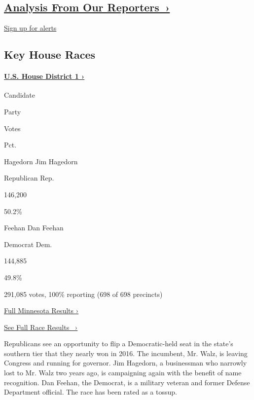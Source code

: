 \hypertarget{analysis-from-our-reporters-}{%
\subsection{\texorpdfstring{\href{https://www.nytimes3xbfgragh.onion/interactive/2018/11/06/us/elections/live-midterm-election-analysis-updates.html}{Analysis
From Our
Reporters~›}}{Analysis From Our Reporters~›}}\label{analysis-from-our-reporters-}}

\protect\hyperlink{}{Sign up for alerts}

\hypertarget{key-house-races}{%
\subsection{Key House Races}\label{key-house-races}}

\hypertarget{us-house-district-1-}{%
\paragraph{\texorpdfstring{\href{https://www.nytimes3xbfgragh.onion/elections/results/minnesota-house-district-1}{U.S.
House District 1
›}}{U.S. House District 1 ›}}\label{us-house-district-1-}}

Candidate

Party

Votes

Pct.

 Hagedorn Jim Hagedorn

Republican Rep.

146,200

50.2\%

 Feehan Dan Feehan

Democrat Dem.

144,885

49.8\%

291,085 votes, 100\% reporting (698 of 698 precincts)

\href{https://www.nytimes3xbfgragh.onion/interactive/2018/11/06/us/elections/results-minnesota-elections.html}{Full
Minnesota Results ›}

\href{https://www.nytimes3xbfgragh.onion/elections/results/minnesota-house-district-1}{See
Full Race Results~ ›}

Republicans see an opportunity to flip a Democratic-held seat in the
state's southern tier that they nearly won in 2016. The incumbent, Mr.
Walz, is leaving Congress and running for governor. Jim Hagedorn, a
businessman who narrowly lost to Mr. Walz two years ago, is campaigning
again with the benefit of name recognition. Dan Feehan, the Democrat, is
a military veteran and former Defense Department official. The race has
been rated as a tossup.

